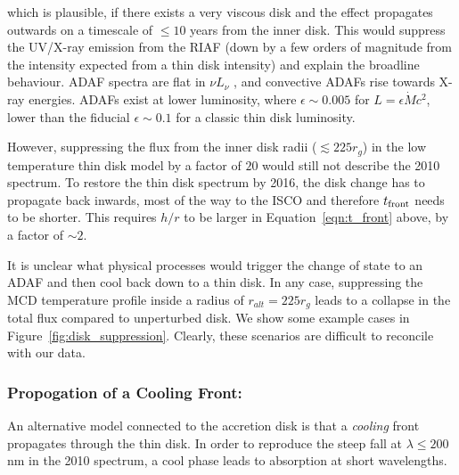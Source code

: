 \documentclass[a4paper,fleqn,usenatbib]{mnras}
\begin{document}
which is plausible, if there exists a very viscous disk and the effect
propagates outwards on a timescale of $\leq 10$ years from the inner
disk. This would suppress the UV/X-ray emission from the RIAF (down by
a few orders of magnitude from the intensity expected from a thin disk
intensity) and explain the broadline behaviour.  ADAF spectra are flat
in $\nu L_{\nu}$ \citet{Narayan1998, Abramowicz2002, Abramowicz2013},
and convective ADAFs rise towards X-ray energies. ADAFs exist at lower
luminosity, where $\epsilon \sim 0.005$ for $L=\epsilon \dot{M}
c^{2}$, lower than the fiducial $\epsilon \sim 0.1$ for a classic thin
disk luminosity.

However, suppressing the flux from the inner disk radii ($\lesssim 225 r_{g}$)
in the low temperature thin disk model \citep{Narayan1997, Gammie1999,
Agol_Krolik2000, Afshordi_Paczynski2003, Ford2018} by a factor of
$20$ would still not describe the 2010 spectrum. To restore the thin disk
spectrum by 2016, the disk change has to propagate back inwards, most
of the way to the ISCO and therefore $t_{\rm front}$ needs to be
shorter. This requires $h/r$ to be larger in
Equation~\ref{eqn:t_front} above, by a factor of $\sim 2$.

It is unclear what physical processes would trigger the change of
state to an ADAF and then cool back down to a thin disk. In any case,
suppressing the MCD temperature profile inside a radius of $r_{alt} =
225 r_{g}$ leads to a collapse in the total flux compared to
unperturbed disk. We show some example cases in
Figure~\ref{fig:disk_suppression}. Clearly, these scenarios are
difficult to reconcile with our data.

\subsubsection{Propogation of a Cooling Front:}
An alternative model connected to the accretion disk is that a
\emph{cooling} front propagates through the thin disk.  In order to
reproduce the steep fall at $\lambda \leq 200$nm in the 2010 spectrum,
a cool phase leads to absorption at short wavelengths.
\end{document}
